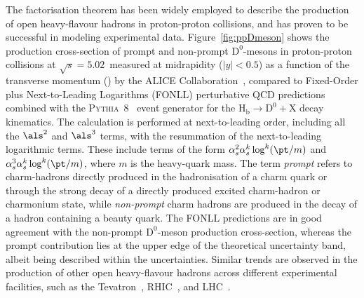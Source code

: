 The factorisation theorem has been widely employed to describe the production of open heavy-flavour hadrons in proton-proton collisions, and has proven to be successful in modeling experimental data. Figure~\ref{fig:ppDmeson} shows the production cross-section of prompt and non-prompt $\mathrm{D^0}$-mesons in proton-proton collisions at $\sqrt{s} = 5.02$~\tev measured at midrapidity ($\lvert y\rvert<0.5$) as a function of the transverse momentum (\pt) by the ALICE Collaboration~\cite{ALICE:2021mgk}, compared to Fixed-Order plus Next-to-Leading Logarithms (FONLL) perturbative QCD predictions~\cite{Cacciari:1998it} combined with the \textsc{Pythia}~8~\cite{Sjostrand:2014zea} event generator for the $\mathrm{H_b \rightarrow D^0+X}$ decay kinematics. The calculation is performed at next-to-leading order, including all the $\als^2$ and $\als^3$ terms, with the resummation of the next-to-leading logarithmic terms. These include terms of the form $\alpha_s^2\alpha_s^k\log^k(\pt/m)$ and $\alpha_s^3\alpha_s^k\log^k(\pt/m)$, where $m$ is the heavy-quark mass. The term \emph{prompt} refers to charm-hadrons directly produced in the hadronisation of a charm quark or through the strong decay of a directly produced excited charm-hadron or charmonium state, while \emph{non-prompt} charm hadrons are produced in the decay of a hadron containing a beauty quark. The FONLL predictions are in good agreement with the non-prompt $\mathrm{D^0}$-meson production cross-section, whereas the prompt contribution lies at the upper edge of the theoretical uncertainty band, albeit being described within the uncertainties. Similar trends are observed in the production of other open heavy-flavour hadrons across different experimental facilities, such as the Tevatron~\cite{CDF:2003vmf}, RHIC~\cite{STAR:2012nbd}, and LHC~\cite{ALICE:2021mgk}.

